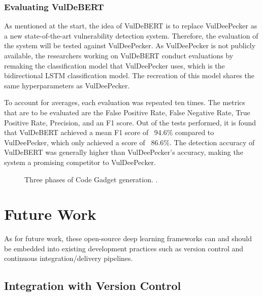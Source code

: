 \documentclass[12pt,twocolumn,letterpaper]{article}
\begin{document}
\subsubsection{Evaluating VulDeBERT}
As mentioned at the start, the idea of VulDeBERT is to replace VulDeePecker as a new state-of-the-art vulnerability detection system. Therefore, the evaluation of the system will be
tested against VulDeePecker. As VulDeePecker is not publicly available, the researchers working on VulDeBERT conduct evaluations by remaking the classification model that
VulDeePecker uses, which is the bidirectional LSTM classification model. The recreation of this model shares the same hyperparameters as VulDeePecker.

To account for averages, each evaluation was repeated ten times. The metrics that are to be evaluated are the False Positive Rate, False Negative Rate, True
Positive Rate, Precision, and an F1 score. Out of the tests performed, it is found that VulDeBERT achieved a mean F1 score of ~94.6\% compared to VulDeePecker, which only achieved a score of ~86.6\%. The detection accuracy of VulDeBERT was generally higher than VulDeePecker's accuracy, making the system a promising competitor
to VulDeePecker.


\begin{figure}[h!]
    \centering
    \caption{Three phases of Code Gadget generation. \cite{Kim22}.}
    \label{fig:af-4}
\end{figure}

\section{Future Work}
\label{sec:future-work}

As for future work, these open-source deep learning frameworks can and should be embedded into existing 
development practices such as version control and continuous integration/delivery pipelines.

\subsection{Integration with Version Control}
\label{sub:integrating-with-version-control}
\end{document}

